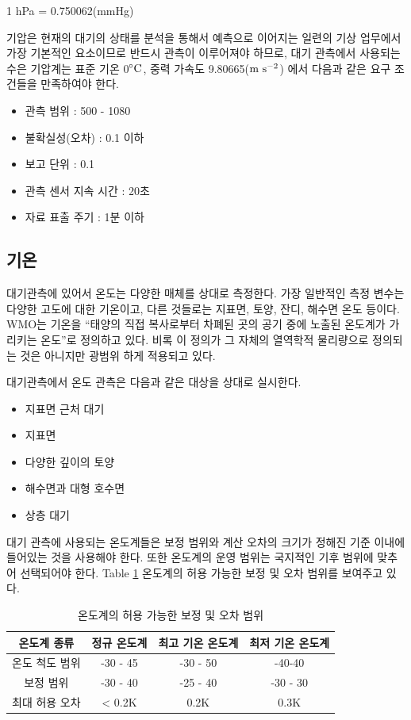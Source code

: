 1 hPa = 0.750062(mmHg)

기압은 현재의 대기의 상태를 분석을 통해서 예측으로 이어지는 일련의 기상 업무에서 가장 기본적인 요소이므로 반드시 관측이 이루어져야 하므로, 대기 관측에서 사용되는 수은 기압계는 표준 기온 0$\rm ^{\circ}C$, 중력 가속도 9.80665($\rm m~s^{-2}$) 에서 다음과 같은 요구 조건들을 만족하여야 한다.

\begin{itemize}
	\item 관측 범위 : 500 - 1080
	\item 불확실성(오차) : 0.1 이하
	\item 보고 단위 : 0.1
	\item 관측 센서 지속 시간 : 20초
	\item 자료 표출 주기 : 1분 이하
\end{itemize}

\subsection{기온}

대기관측에 있어서 온도는 다양한 매체를 상대로 측정한다. 가장 일반적인 측정 변수는 다양한 고도에 대한 기온이고, 다른 것들로는 지표면, 토양, 잔디, 해수면 온도 등이다. WMO는 기온을 “태양의 직접 복사로부터 차폐된 곳의 공기 중에 노출된 온도계가 가리키는 온도”로 정의하고 있다. 비록 이 정의가 그 자체의 열역학적 물리량으로 정의되는 것은 아니지만 광범위 하게 적용되고 있다.

대기관측에서 온도 관측은 다음과 같은 대상을 상대로 실시한다.
\begin{itemize}
	\item 지표면 근처 대기
	\item 지표면
	\item 다양한 깊이의 토양
	\item 해수면과 대형 호수면
	\item 상층 대기
\end{itemize}

대기 관측에 사용되는 온도계들은 보정 범위와 계산 오차의 크기가 정해진 기준 이내에 들어있는 것을 사용해야 한다. 또한 온도계의 운영 범위는 국지적인 기후 범위에 맞추어 선택되어야 한다. Table \ref{table:22} \은 온도계의 허용 가능한 보정 및 오차 범위를 보여주고 있다.

\begin{table}[h]
	\centering
	\caption{온도계의 허용 가능한 보정 및 오차 범위}
\begin{tabular}{c|c|c|c}
	\hline 
	온도계 종류 & 정규 온도계 & 최고 기온 온도계 & 최저 기온 온도계 \\ 	\hline 
	온도 척도 범위 & -30 - 45 & -30 - 50 & -40-40 \\ 	\hline 
	보정 범위 & -30 - 40 & -25 - 40 & -30 - 30 \\ \hline 
	최대 허용 오차 & < 0.2K  & 0.2K & 0.3K  \\ 	\hline 
\end{tabular} 
	\label{table:22}
\end{table}

